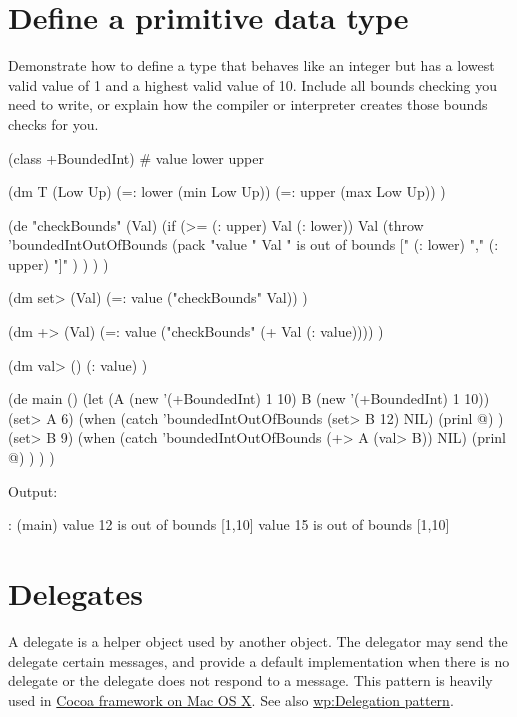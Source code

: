 \pagebreak{}
\section*{Define a primitive data type}


Demonstrate how to define a type that behaves like an integer but has a
lowest valid value of 1 and a highest valid value of 10. Include all
bounds checking you need to write, or explain how the compiler or
interpreter creates those bounds checks for you.



\begin{wideverbatim}

(class +BoundedInt)
# value lower upper

(dm T (Low Up)
   (=: lower (min Low Up))
   (=: upper (max Low Up)) )

(de "checkBounds" (Val)
   (if (>= (: upper) Val (: lower))
      Val
      (throw 'boundedIntOutOfBounds
         (pack
            "value " Val
            " is out of bounds [" (: lower) "," (: upper) "]" ) ) ) )

(dm set> (Val)
   (=: value ("checkBounds" Val)) )

(dm +> (Val)
   (=: value ("checkBounds" (+ Val (: value)))) )

(dm val> ()
   (: value) )

(de main ()
   (let (A (new '(+BoundedInt) 1 10)  B (new '(+BoundedInt) 1 10))
      (set> A 6)
      (when (catch 'boundedIntOutOfBounds (set> B 12) NIL)
         (prinl @) )
      (set> B 9)
      (when (catch 'boundedIntOutOfBounds (+> A (val> B)) NIL)
         (prinl @) ) ) )

Output:

: (main)
value 12 is out of bounds [1,10]
value 15 is out of bounds [1,10]

\end{wideverbatim}

\pagebreak{}
\section*{Delegates}

A delegate is a helper object used by another object. The delegator may
send the delegate certain messages, and provide a default implementation
when there is no delegate or the delegate does not respond to a message.
This pattern is heavily used in
\href{http://developer.apple.com/documentation/Cocoa/Conceptual/CocoaFundamentals/CocoaDesignPatterns/chapter\_5\_section\_3.html\#//apple\_ref/doc/uid/TP40002974-CH6-DontLinkElementID\_93}{Cocoa
framework on Mac OS X}. See also
\href{http://en.wikipedia.org/wiki/Delegation\_pattern}{wp:Delegation
pattern}.

